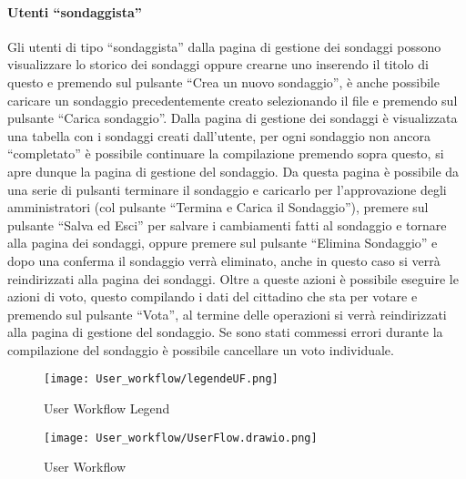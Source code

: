 \paragraph{Utenti ``sondaggista''}
Gli utenti di tipo ``sondaggista'' dalla pagina di gestione dei sondaggi possono visualizzare lo storico dei sondaggi oppure crearne uno inserendo il titolo di questo e premendo sul pulsante ``Crea un nuovo sondaggio'', è anche possibile caricare un sondaggio precedentemente creato selezionando il file e premendo sul pulsante ``Carica sondaggio''. Dalla pagina di gestione dei sondaggi è visualizzata una tabella con i sondaggi creati dall'utente, per ogni sondaggio non ancora ``completato'' è possibile continuare la compilazione premendo sopra questo, si apre dunque la pagina di gestione del sondaggio. Da questa pagina è possibile da una serie di pulsanti terminare il sondaggio e caricarlo per l'approvazione degli amministratori (col pulsante ``Termina e Carica il Sondaggio''), premere sul pulsante ``Salva ed Esci'' per salvare i cambiamenti fatti al sondaggio e tornare alla pagina dei sondaggi, oppure premere sul pulsante ``Elimina Sondaggio'' e dopo una conferma il sondaggio verrà eliminato, anche in questo caso si verrà reindirizzati alla pagina dei sondaggi. Oltre a queste azioni è possibile eseguire le azioni di voto, questo compilando i dati del cittadino che sta per votare e premendo sul pulsante ``Vota'', al termine delle operazioni si verrà reindirizzati alla pagina di gestione del sondaggio. Se sono stati commessi errori durante la compilazione del sondaggio è possibile cancellare un voto individuale.
\begin{figure}
    \centering
    \texttt{[image: User\_workflow/legendeUF.png]}
    \caption{User Workflow Legend}
    \label{fig:UserWorkflowLegend}
\end{figure}
\begin{figure}
    \centering
    \texttt{[image: User\_workflow/UserFlow.drawio.png]}
    \caption{User Workflow}
    \label{fig:UserWorkflow}
\end{figure}